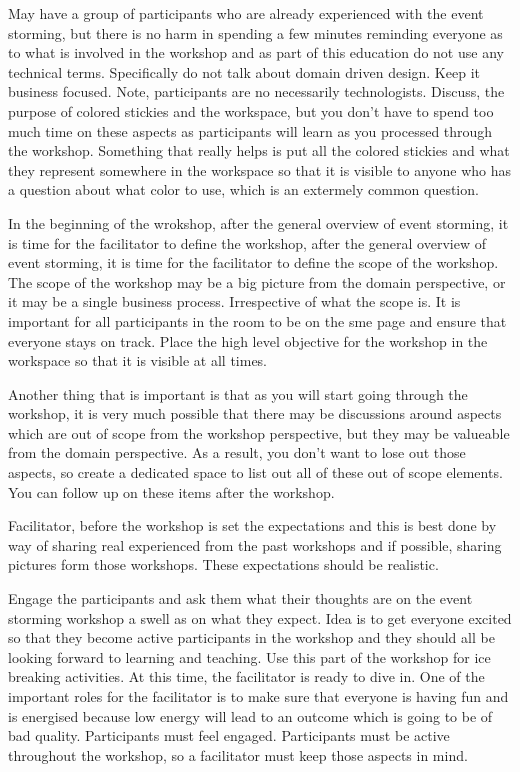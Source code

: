 May have a group of participants who are already experienced with the event storming, but there is no harm in spending a few minutes reminding everyone as to what is involved in the workshop and as part of this education do not use any technical terms.
Specifically do not talk about domain driven design.
Keep it business focused.
Note, participants are no necessarily technologists.
Discuss, the purpose of colored stickies and the workspace, but you don't have to spend too much time on these aspects as participants will learn as you processed through the workshop.
Something that really helps is put all the colored stickies and what they represent somewhere in the workspace so that it is visible to anyone who has a question about what color to use, which is an extermely common question.

In the beginning of the wrokshop, after the general overview of event storming, it is time for the facilitator to define the workshop, after the general overview of event storming, it is time for the facilitator to define the scope of the workshop.
The scope of the workshop may be a big picture from the domain perspective, or it may be a single business process.
Irrespective of what the scope is.
It is important for all participants in the room to be on the sme page and ensure that everyone stays on track.
Place the high level objective for the workshop in the workspace so that it is visible at all times.

Another thing that is important is that as you will start going through the workshop, it is very much possible that there may be discussions around aspects which are out of scope from the workshop perspective, but they may be valueable from the domain perspective.
As a result, you don't want to lose out those aspects, so create a dedicated space to list out all of these out of scope elements.
You can follow up on these items after the workshop.

Facilitator, before the workshop is set the expectations and this is best done by way of sharing real experienced from the past workshops and if possible, sharing pictures form those workshops.
These expectations should be realistic.

Engage the participants and ask them what their thoughts are on the event storming workshop a swell as on what they expect.
Idea is to get everyone excited so that they become active participants in the workshop and they should all be looking forward to learning and teaching.
Use this part of the workshop for ice breaking activities.
At this time, the facilitator is ready to dive in.
One of the important roles for the facilitator is to make sure that everyone is having fun and is energised because low energy will lead to an outcome which is going to be of bad quality.
Participants must feel engaged.
Participants must be active throughout the workshop, so a facilitator must keep those aspects in mind.

